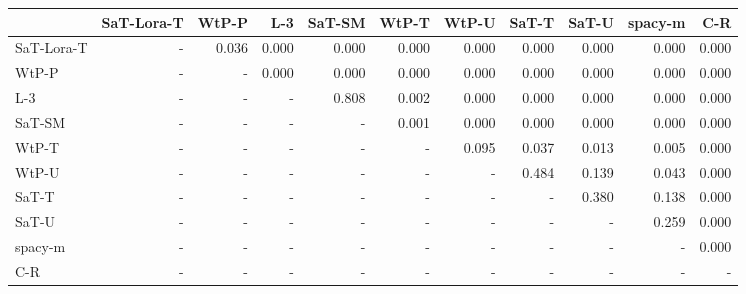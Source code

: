 \begin{tabular}{lrrrrrrrrrr}
\toprule
 & SaT-Lora-T & WtP-P & L-3 & SaT-SM & WtP-T & WtP-U & SaT-T & SaT-U & spacy-m & C-R \\
\midrule
SaT-Lora-T & - & 0.036 & 0.000 & 0.000 & 0.000 & 0.000 & 0.000 & 0.000 & 0.000 & 0.000 \\
WtP-P & - & - & 0.000 & 0.000 & 0.000 & 0.000 & 0.000 & 0.000 & 0.000 & 0.000 \\
L-3 & - & - & - & 0.808 & 0.002 & 0.000 & 0.000 & 0.000 & 0.000 & 0.000 \\
SaT-SM & - & - & - & - & 0.001 & 0.000 & 0.000 & 0.000 & 0.000 & 0.000 \\
WtP-T & - & - & - & - & - & 0.095 & 0.037 & 0.013 & 0.005 & 0.000 \\
WtP-U & - & - & - & - & - & - & 0.484 & 0.139 & 0.043 & 0.000 \\
SaT-T & - & - & - & - & - & - & - & 0.380 & 0.138 & 0.000 \\
SaT-U & - & - & - & - & - & - & - & - & 0.259 & 0.000 \\
spacy-m & - & - & - & - & - & - & - & - & - & 0.000 \\
C-R & - & - & - & - & - & - & - & - & - & - \\
\bottomrule
\end{tabular}

